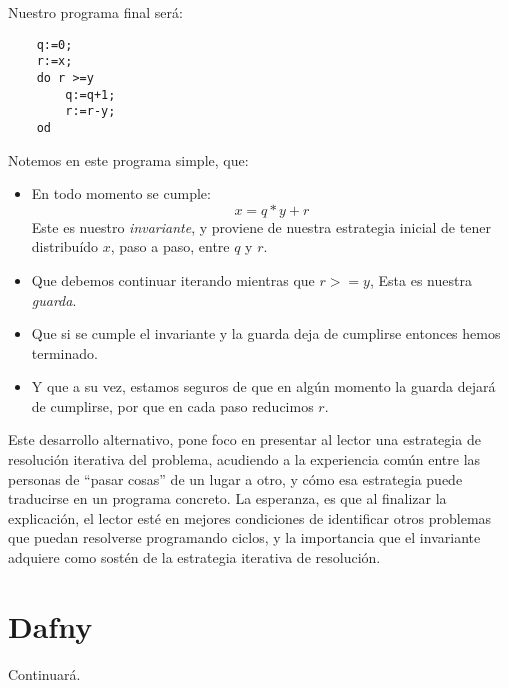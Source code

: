 \documentclass[12pt, a4paper, openany, fleqn]{book}
\begin{document}
    Nuestro programa final será:
    \begin{verbatim}
    q:=0;
    r:=x;
    do r >=y
        q:=q+1;
        r:=r-y;
    od
    \end{verbatim}
    Notemos en este programa simple, que:
    \begin{itemize}
        \item En todo momento se cumple:
        $$x = q * y + r$$
        Este es nuestro \textit{invariante}, y proviene de nuestra estrategia inicial de tener distribuído $x$, paso a paso, entre $q$ y $r$.
        \item Que debemos continuar iterando mientras que $r >= y$,
        Esta es nuestra \textit{guarda}.
        \item Que si se cumple el invariante y la guarda deja de cumplirse entonces hemos terminado.
        \item Y que a su vez, estamos seguros de que en algún momento la guarda dejará de cumplirse, por que en cada paso reducimos $r$.
    \end{itemize}

    Este desarrollo alternativo, pone foco en presentar al lector una estrategia de resolución iterativa del problema, acudiendo a la experiencia común entre las personas de ``pasar cosas'' de un lugar a otro, y cómo esa estrategia puede traducirse en un programa concreto.
    La esperanza, es que al finalizar la explicación, el lector esté en mejores condiciones de identificar otros problemas que puedan resolverse programando ciclos, y la importancia que el invariante adquiere como sostén de la estrategia iterativa de resolución.
    \chapter{Dafny}
    Continuará.
\end{document}

